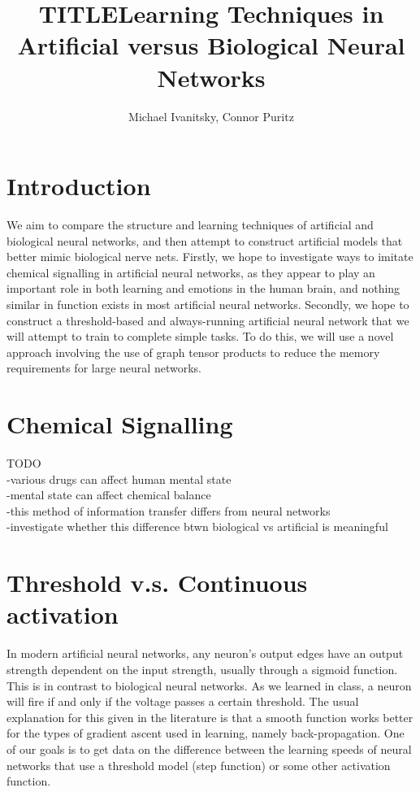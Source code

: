 \documentclass{article}
\date{}
\title{TITLE}
\author{Michael Ivanitsky, Connor Puritz}
\title{Learning Techniques in Artificial versus Biological Neural Networks}
\begin{document}
\maketitle


\section{Introduction}

We aim to compare the structure and learning techniques of artificial and biological neural networks, and then attempt to construct artificial models that better mimic biological nerve nets. Firstly, we hope to investigate ways to imitate chemical signalling in artificial neural networks, as they appear to play an important role in both learning and emotions in the human brain, and nothing similar in function exists in most artificial neural networks. Secondly, we hope to construct a threshold-based and always-running artificial neural network that we will attempt to train to complete simple tasks. To do this, we will use a novel approach involving the use of graph tensor products to reduce the memory requirements for large neural networks.

\section{Chemical Signalling}
TODO \\
-various drugs can affect human mental state \\
-mental state can affect chemical balance \\
-this method of information transfer differs from neural networks \\
-investigate whether this difference btwn biological vs artificial is meaningful \\

\section{Threshold v.s. Continuous activation}

In modern artificial neural networks, any neuron's output edges have an output strength dependent on the input strength, usually through a sigmoid function. This is in contrast to biological neural networks. As we learned in class, a neuron will fire if and only if the voltage passes a certain threshold. The usual explanation for this given in the literature is that a smooth function works better for the types of gradient ascent used in learning, namely back-propagation. One of our goals is to get data on the difference between the learning speeds of neural networks that use a threshold model (step function) or some other activation function.
\end{document}
